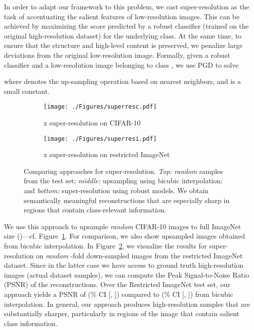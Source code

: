 \documentclass{article}
\begin{document}
{In order to adapt our framework to this problem,
we cast super-resolution as the task of accentuating the salient
features of low-resolution images.
This can be achieved by maximizing the score predicted by a robust classifier 
(trained on the original high-resolution dataset)
for the underlying class.
At the same time, to ensure that the structure and high-level content is preserved, we penalize
large deviations from the original low-resolution image.
Formally, given a robust classifier
and a low-resolution image  belonging to class
, we  use PGD to solve

where  denotes the up-sampling operation based on nearest
neighbors, and  is a small constant.

\begin{figure}[!h]
	\centering
	\begin{subfigure}[b]{0.495\textwidth}
		\centering
		\texttt{[image: ./Figures/superresc.pdf]}
		\caption{x super-resolution on CIFAR-10}
		\label{fig:superres_cifar}
	\end{subfigure}
	\hfil
	\begin{subfigure}[b]{0.495\textwidth}
		\centering
		\texttt{[image: ./Figures/superresi.pdf]}
		\caption{x super-resolution on restricted ImageNet}
		\label{fig:superres_in}
	\end{subfigure}
	\caption{Comparing approaches for super-resolution. 
		\textit{Top:} \emph{random} samples from the test set;
		\textit{middle:} upsampling using bicubic interpolation; and
		\textit{bottom:} super-resolution using robust models. We obtain 
		semantically meaningful reconstructions that are especially sharp
		in regions that contain class-relevant information.
	}
	\label{fig:superres}
\end{figure}


We use this approach to upsample
\emph{random}  CIFAR-10 images to full ImageNet size ()---cf. Figure~\ref{fig:superres_cifar}. For comparison, we also show upsampled images obtained 
from bicubic interpolation. 
In Figure~\ref{fig:superres_in}, we visualize the results for super-resolution on 
\emph{random} -fold down-sampled images from the restricted 
ImageNet dataset. Since  in the latter case we have access to ground truth 
high-resolution images (actual dataset samples), we can
compute the Peak Signal-to-Noise Ratio (PSNR) of the reconstructions.
Over the Restricted ImageNet 
test set, our approach yields a PSNR of  
(\% CI [, ]) compared to
 (\% CI [, ]) from bicubic interpolation. 
In general, our approach produces 
high-resolution samples that are substantially sharper, particularly in regions 
of the image that contain salient class information.

}
\end{document}
